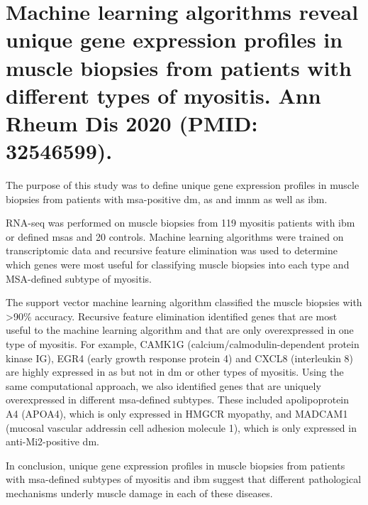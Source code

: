 \section{Machine learning algorithms reveal unique gene expression profiles in muscle biopsies from patients with different types of myositis. Ann Rheum Dis 2020 (PMID: 32546599).}
\label{sec:rnaseq_ml}

The purpose of this study was to define unique gene expression profiles in muscle biopsies from patients with \gls{msa}-positive \gls{dm}, \gls{as} and \gls{imnm} as well as \gls{ibm}.

RNA-seq was performed on muscle biopsies from 119 myositis patients with \gls{ibm} or defined \gls{msa}s and 20 controls. Machine learning algorithms were trained on transcriptomic data and recursive feature elimination was used to determine which genes were most useful for classifying muscle biopsies into each type and MSA-defined subtype of myositis.

The support vector machine learning algorithm classified the muscle biopsies with >90\% accuracy. Recursive feature elimination identified genes that are most useful to the machine learning algorithm and that are only overexpressed in one type of myositis.
For example, CAMK1G (calcium/calmodulin-dependent protein kinase IG), EGR4 (early growth response protein 4) and CXCL8 (interleukin 8) are highly expressed in \gls{as} but not in \gls{dm} or other types of myositis. Using the same computational approach, we also identified genes that are uniquely overexpressed in different \gls{msa}-defined subtypes. These included apolipoprotein A4 (APOA4), which is only expressed in HMGCR myopathy, and MADCAM1 (mucosal vascular addressin cell adhesion molecule 1), which is only expressed in anti-Mi2-positive \gls{dm}.

In conclusion, unique gene expression profiles in muscle biopsies from patients with \gls{msa}-defined subtypes of myositis and \gls{ibm} suggest that different pathological mechanisms underly muscle damage in each of these diseases.

